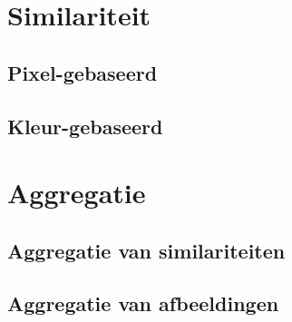 \documentclass[dutch,11pt,cite,titlepage]{report}
\begin{document}


\newcommand{\auteur}{Klaas Bosteels}
\newcommand{\jaar}{2005--2006}
\newcommand{\titel}{Similariteitsgebaseerd rangschikken van afbeeldingen in zoekmachines}
\newcommand{\begeleider}{lic.\ M.\ de Leider  en ir.\  M.\ de Lijder}
\newcommand{\richting}{licentiaat in de informatica, optie: software-ontwikkeling}

\newcommand{\vakgroep}{Toegepaste Wiskunde en Informatica}
\newcommand{\voorzitter}{Prof.\ dr.\ Guido\ Vanden\ Berghe}
\newcommand{\promotor}{prof.\ dr.\ \ E.\ E.\ Kerre}


\setcounter{page}{1}
\renewcommand{\baselinestretch}{1}

\tableofcontents %

\renewcommand{\baselinestretch}{1}
\setcounter{page}{1}









\chapter{Similariteit}

\section{Pixel-gebaseerd}
\section{Kleur-gebaseerd}

\chapter{Aggregatie}

\section{Aggregatie van similariteiten}
\section{Aggregatie van afbeeldingen}
\end{document}
